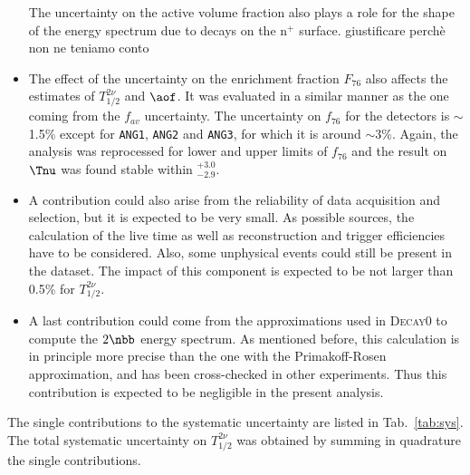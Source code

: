 \begin{itemize}
		The uncertainty on the active volume fraction also plays a role for the shape of the energy spectrum due to  decays on the n$^+$ surface. {\color{red}giustificare perchè non ne teniamo conto}
	\item The effect of the uncertainty on the enrichment fraction $F_{76}$ also affects the estimates of $T_{1/2}^{2\nu}$ and $\aof$. It was evaluated in a similar manner as the one coming from the $f_{av}$ uncertainty. The uncertainty on $f_{76}$ for the detectors is $\sim$1.5\% except for \texttt{ANG1}, \texttt{ANG2} and \texttt{ANG3}, for which it is around $\sim$3\%. Again, the analysis was reprocessed for lower and upper limits of $f_{76}$ and the result on $\Tnu$ was found stable within $^{+3.0}_{-2.9}$.
	\item A contribution could also arise from the reliability of data acquisition and selection, but it is expected to be very small. As possible sources, the calculation of the live time as well as reconstruction and trigger efficiencies have to be considered. Also, some unphysical events could still be present in the dataset. The impact of this component is expected to be not larger than 0.5\% for $T_{1/2}^{2\nu}$.
	\item A last contribution could come from the approximations used in \textsc{Decay0} to compute the $2\nbb$ energy spectrum. As mentioned before, this calculation is in principle more precise than the one with the Primakoff-Rosen approximation, and has been cross-checked in other experiments. Thus this contribution is expected to be negligible in the present analysis.
\end{itemize}

The single contributions to the systematic uncertainty are listed in Tab.~\ref{tab:sys}. The total systematic uncertainty on $T_{1/2}^{2\nu}$ was obtained by summing in quadrature the single contributions.

